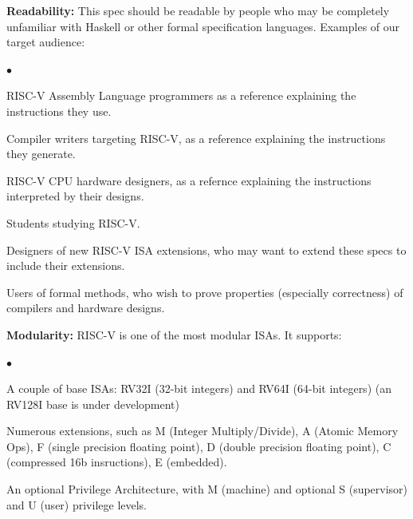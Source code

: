 \documentclass[11pt]{article}
\newenvironment{tightlist}%
{\begin{list}{$\bullet$}{%
    \setlength{\topsep}{0in}
    \setlength{\partopsep}{0in}
    \setlength{\itemsep}{0in}
    \setlength{\parsep}{0in}
    \setlength{\leftmargin}{1.5em}
    \setlength{\rightmargin}{0in}
    \setlength{\itemindent}{0in}
}
}%
{\end{list}
}
\begin{document}
\begin{itemize}

\item {\bf Readability:} This spec should be readable by people who
may be completely unfamiliar with Haskell or other formal
specification languages.  Examples of our target audience:

  \begin{tightlist}
   \item RISC-V Assembly Language programmers as a reference explaining the instructions they use.

   \item Compiler writers targeting RISC-V, as a reference explaining the instructions they generate.

   \item RISC-V CPU hardware designers, as a refernce explaining the instructions interpreted by their designs.

   \item Students studying RISC-V.

   \item Designers of new RISC-V ISA extensions, who may want to
   extend these specs to include their extensions.

   \item Users of formal methods, who wish to prove properties
   (especially correctness) of compilers and hardware designs.

  \end{tightlist}

\item {\bf Modularity:} RISC-V is one of the most modular ISAs.  It
supports:

  \begin{tightlist}

   \item A couple of base ISAs: RV32I (32-bit integers) and RV64I
     (64-bit integers) (an RV128I base is under development)

   \item Numerous extensions, such as M (Integer Multiply/Divide), A
    (Atomic Memory Ops), F (single precision floating point), D
    (double precision floating point), C (compressed 16b insructions), E (embedded).

   \item An optional Privilege Architecture, with M (machine) and
    optional S (supervisor) and U (user) privilege levels.


\end{tightlist}
\end{itemize}
\end{document}

